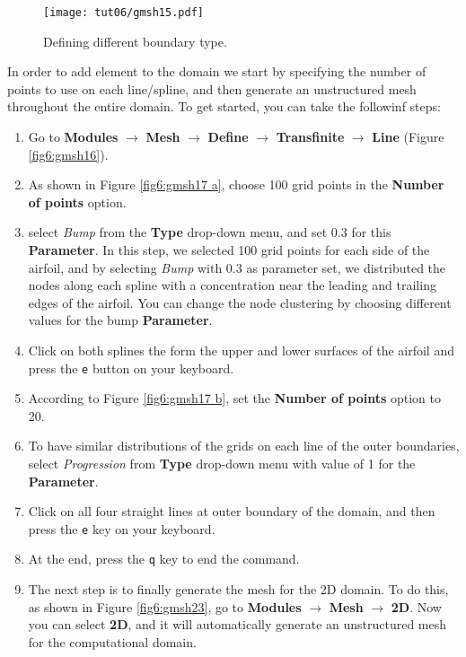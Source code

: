\begin{figure}[ht]
    \centering
    \texttt{[image: tut06/gmsh15.pdf]}
    \caption{Defining different boundary type.}
    \label{fig6:gmsh15}
\end{figure}
In order to add element to the domain we start by specifying the number of points to use on each line/spline, and then generate an unstructured mesh throughout the entire domain. To get started, you can take the followinf steps:
\begin{enumerate}[label=\arabic*)]
	\setcounter{enumi}{0}
	\item Go to \textbf{Modules} $\rightarrow$ \textbf{Mesh} $\rightarrow$ \textbf{Define} $\rightarrow$ \textbf{Transfinite} $\rightarrow$ \textbf{Line} (Figure \ref{fig6:gmsh16}).
	\item As shown in Figure \ref{fig6:gmsh17 a}, choose 100 grid points in the \textbf{Number of points} option.
	\item select \textit{Bump} from the \textbf{Type} drop-down menu, and set 0.3 for this \textbf{Parameter}. In this step, we selected 100 grid points for each side of the airfoil, and by selecting \textit{Bump} with 0.3 as parameter set, we distributed the nodes along each spline with a concentration near the leading and trailing edges of the airfoil. You can change the node clustering by choosing different values for the bump \textbf{Parameter}.
	\item Click on both splines the form the upper and lower surfaces of the airfoil and press the \texttt{e} button on your keyboard.
	\item According to Figure \ref{fig6:gmsh17 b}, set the \textbf{Number of points} option to 20.
	\item To have similar distributions of the grids on each line of the outer boundaries, select \textit{Progression} from \textbf{Type} drop-down menu with value of 1 for the \textbf{Parameter}.
	\item Click on all four straight lines at outer boundary of the domain, and then press the \texttt{e} key on your keyboard.
	\item At the end, press the \texttt{q} key to end the command.
	\item The next step is to finally generate the mesh for the 2D domain. To do this, as shown in Figure \ref{fig6:gmsh23}, go to \textbf{Modules} $\rightarrow$ \textbf{Mesh} $\rightarrow$ \textbf{2D}. Now you can select \textbf{2D}, and it will  automatically generate an unstructured mesh for the computational domain.
\end{enumerate}
